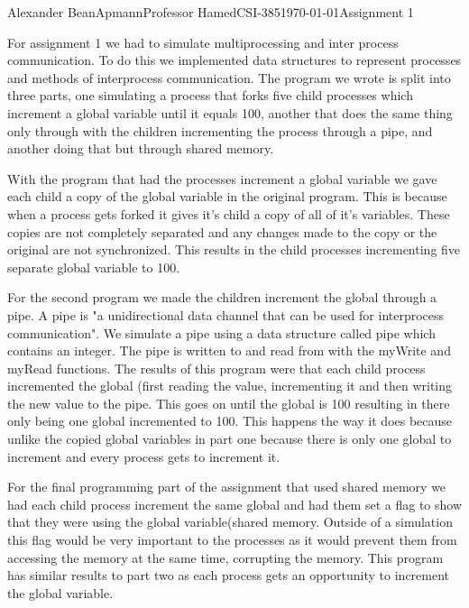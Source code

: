 \documentclass[12pt,letterpaper]{article}
\begin{document}
\begin{mla}{Alexander Bean}{Apmann}{Professor Hamed}{CSI-385}{\today}{Assignment 1}

For assignment 1 we had to simulate multiprocessing and inter process communication. To do this we implemented data structures to represent processes and methods of interprocess communication. The program we wrote is split into three parts, one simulating a process that forks five child processes which increment a global variable until it equals 100, another that does the same thing only through with the children incrementing the process through a pipe, and another doing that but through shared memory.

With the program that had the processes increment a global variable we gave each child a copy of the global variable in the original program. This is because when a process gets forked it gives it's child a copy of all of it's variables. These copies are not completely separated and any changes made to the copy or the original are not synchronized. This results in the child processes incrementing five separate global variable to 100.

For the second program we made the children increment the global through a pipe. A pipe is "a unidirectional data channel that can be used for interprocess communication". We simulate a pipe using a data structure called pipe which contains an integer. The pipe is written to and read from with the myWrite and myRead functions. The results of this program were that each child process incremented the global (first reading the value, incrementing it and then writing the new value to the pipe. This goes on until the global is 100 resulting in there only being one global incremented to 100. This happens the way it does because unlike the copied global variables in part one because there is only one global to increment and every process gets to increment it.

For the final programming part of the assignment that used shared memory we had each child process increment the same global and had them set a flag to show that they were using the global variable(shared memory. Outside of a simulation this flag would be very important to the processes as it would prevent them from accessing the memory at the same time, corrupting the memory. This program has similar results to part two as each process gets an opportunity to increment the global variable.

\end{mla}
\end{document}
